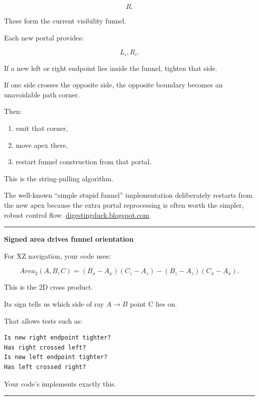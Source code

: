 \[
R.
\]

These form the current visibility funnel.

Each new portal provides:

\[
L_i,R_i.
\]

If a new left or right endpoint lies inside the funnel, tighten that side.

If one side crosses the opposite side, the opposite boundary becomes an unavoidable path corner.

Then:

\begin{enumerate}
\def\labelenumi{\arabic{enumi}.}
\tightlist
\item
  emit that corner,
\item
  move apex there,
\item
  restart funnel construction from that portal.
\end{enumerate}

This is the string-pulling algorithm.

The well-known ``simple stupid funnel'' implementation deliberately restarts from the new apex because the extra portal reprocessing is often worth the simpler, robust control flow. \href{https://digestingduck.blogspot.com/2010/03/simple-stupid-funnel-algorithm.html?utm_source=chatgpt.com}{digestingduck.blogspot.com}

\begin{center}\rule{0.5\linewidth}{0.5pt}\end{center}

\textbf{Signed area drives funnel orientation}

For XZ navigation, your code uses:

\[
Area_2(A,B,C)
=
(B_x-A_x)(C_z-A_z)
-
(B_z-A_z)(C_x-A_x).
\]

This is the 2D cross product.

Its sign tells us which side of ray \(A\rightarrow B\) point C lies on.

That allows tests such as:

\begin{verbatim}
Is new right endpoint tighter?
Has right crossed left?
Is new left endpoint tighter?
Has left crossed right?
\end{verbatim}

Your code's  implements exactly this.

\begin{center}\rule{0.5\linewidth}{0.5pt}\end{center}

